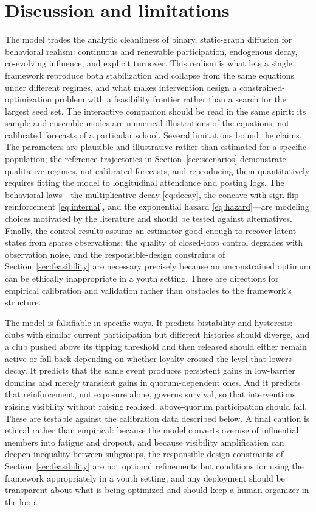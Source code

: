 \documentclass[11pt]{article}
\begin{document}
\section{Discussion and limitations}\label{sec:discussion}
The model trades the analytic cleanliness of binary, static-graph diffusion for behavioral realism: continuous and renewable participation, endogenous decay, co-evolving influence, and explicit turnover. This realism is what lets a single framework reproduce both stabilization and collapse from the same equations under different regimes, and what makes intervention design a constrained-optimization problem with a feasibility frontier rather than a search for the largest seed set. The interactive companion should be read in the same spirit: its sample and ensemble modes are numerical illustrations of the equations, not calibrated forecasts of a particular school. Several limitations bound the claims. The parameters are plausible and illustrative rather than estimated for a specific population; the reference trajectories in Section~\ref{sec:scenarios} demonstrate qualitative regimes, not calibrated forecasts, and reproducing them quantitatively requires fitting the model to longitudinal attendance and posting logs. The behavioral laws---the multiplicative decay \eqref{eq:decay}, the concave-with-sign-flip reinforcement \eqref{eq:internal}, and the exponential hazard \eqref{eq:hazard}---are modeling choices motivated by the literature and should be tested against alternatives. Finally, the control results assume an estimator good enough to recover latent states from sparse observations; the quality of closed-loop control degrades with observation noise, and the responsible-design constraints of Section~\ref{sec:feasibility} are necessary precisely because an unconstrained optimum can be ethically inappropriate in a youth setting. These are directions for empirical calibration and validation rather than obstacles to the framework's structure.

The model is falsifiable in specific ways. It predicts bistability and hysteresis: clubs with similar current participation but different histories should diverge, and a club pushed above its tipping threshold and then released should either remain active or fall back depending on whether loyalty crossed the level that lowers decay. It predicts that the same event produces persistent gains in low-barrier domains and merely transient gains in quorum-dependent ones. And it predicts that reinforcement, not exposure alone, governs survival, so that interventions raising visibility without raising realized, above-quorum participation should fail. These are testable against the calibration data described below. A final caution is ethical rather than empirical: because the model converts overuse of influential members into fatigue and dropout, and because visibility amplification can deepen inequality between subgroups, the responsible-design constraints of Section~\ref{sec:feasibility} are not optional refinements but conditions for using the framework appropriately in a youth setting, and any deployment should be transparent about what is being optimized and should keep a human organizer in the loop.
\end{document}
